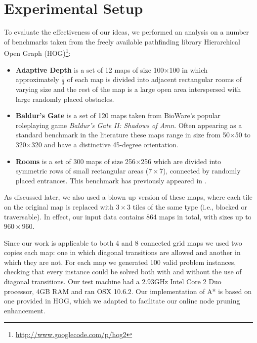 \section{Experimental Setup}
To evaluate the effectiveness of our ideas, we performed
an analysis on a number of benchmarks taken from
the freely available pathfinding library 
Hierarchical Open Graph (HOG)\footnote{\url{http://www.googlecode.com/p/hog2}}:
\begin{itemize}
\item{\textbf{Adaptive Depth} is a set of 12 maps of size 100$\times$100 in which approximately
$\frac{1}{3}$ of each map is divided into adjacent rectangular rooms of
varying size and the rest of the map is a large open area interspersed with 
large randomly placed obstacles.}
\item{\textbf{Baldur's Gate} is a set of 120 maps taken from BioWare's popular
roleplaying game \emph{Baldur's Gate II: Shadows of Amn}. 
Often appearing as a standard benchmark in the literature 
\cite{botea04,sturtevant05,bjornsson06,harabor10,pochter10} these maps range in 
size from 50$\times$50 to 320$\times$320 and have a distinctive 45-degree orientation.}
\item{\textbf{Rooms} is a set of 300 maps of size 256$\times$256 which are
divided into symmetric rows of small rectangular areas ($7\times7$), connected
by randomly placed entrances. This benchmark has previously appeared in
\cite{pochter10}.}
\end{itemize}

As discussed later, we also used a blown up version of these maps,
where each tile on the original map is replaced with $3\times3$ tiles of the same type
(i.e., blocked or traversable). In effect, our input data contains 864 maps in total,
with sizes up to $960\times960$.

Since our work is applicable to both 4 and 8 connected grid maps we used two
copies each map: one in which diagonal transitions are allowed and another
in which they are not.
For each map we generated 100 valid problem instances, checking that every
instance could be solved both with and without the use of diagonal
transitions.
%
Our test machine had a 2.93GHz Intel Core 2 Duo processor, 4GB RAM and
ran OSX 10.6.2.
Our implementation of A* is based on one provided in HOG, which we adapted to
facilitate our online node pruning enhancement.
